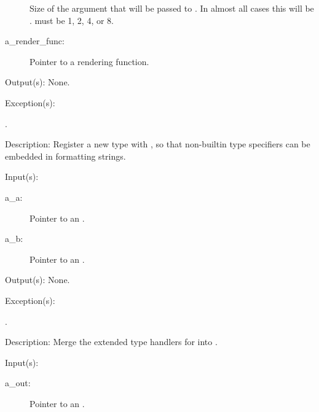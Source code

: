 \begin{capi}
\begin{capilist}
\begin{description}
			Size of the argument that will be passed to
			.  In almost all cases this will be
			.   must be 1, 2, 4,
			or 8.
		\item[a\_render\_func: ]
			Pointer to a rendering function.
		\end{description}
	\item[Output(s): ] None.
	\item[Exception(s): ]
		\begin{description}\item[]
		\item[.]
		\end{description}
	\item[Description: ]
		Register a new type with , so that non-builtin type
		specifiers can be embedded in formatting strings.
	\end{capilist}
\label{out_merge}
	\begin{capilist}
	\item[Input(s): ]
		\begin{description}\item[]
		\item[a\_a: ]
			Pointer to an .
		\item[a\_b: ]
			Pointer to an .
		\end{description}
	\item[Output(s): ] None.
	\item[Exception(s): ]
		\begin{description}\item[]
		\item[.]
		\end{description}
	\item[Description: ]
		Merge the extended type handlers for  into
		.
	\end{capilist}
\label{out_default_fd_get}
	\begin{capilist}
	\item[Input(s): ]
		\begin{description}\item[]
		\item[a\_out: ]
			Pointer to an \classname{out}.

\end{description}
\end{capilist}
\end{capi}
